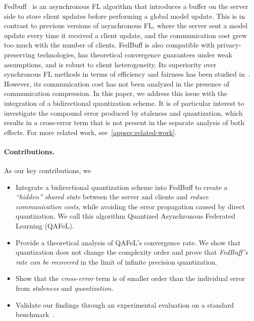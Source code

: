 \documentclass[nohyperref]{article}
\theoremstyle{plain}
\theoremstyle{definition}
\theoremstyle{remark}
\newcommand{\algname}{{QAFeL}\xspace} %
\begin{document}
Fedbuff~\cite{FedBuff} is an asynchronous FL algorithm that introduces a buffer on the server side to store client updates before performing a global model update.
This is in contrast to previous versions of asynchronous FL, where the server sent a model update every time it received a client update, and the communication cost grew too much with the number of clients.
FedBuff is also compatible with privacy-preserving technologies, has theoretical convergence guarantees under weak assumptions, and is robust to client heterogeneity.
Its superiority over synchronous FL methods in terms of efficiency and fairness has been studied in~\cite{papaya}.
However, its communication cost has not been analyzed in the presence of communication compression.
In this paper, we address this issue with the integration of a bidirectional quantization scheme.
It is of particular interest to investigate the compound error produced by staleness and quantization, which results in a cross-error term that is not present in the separate analysis of both effects.
For more related work, see~\cref{appsec:related-work}.
\vspace{-.1cm}
\paragraph{Contributions.} As our key contributions, we
\begin{itemize}[topsep=0pt, noitemsep]
    \setlength{\itemsep}{0pt}%
    \item Integrate a bidirectional quantization scheme into FedBuff to create a \emph{``hidden'' shared state} between the server and clients and \emph{reduce communication costs}, while avoiding the error propagation caused by direct quantization. We call this algorithm Quantized Asynchronous Federated Learning (\algname{}).
    \item Provide a theoretical analysis of \algname{}'s convergence rate. We show that quantization does not change the complexity order and prove that \emph{FedBuff's rate can be recovered} in the limit of infinite precision quantization.
    \item Show that the \emph{cross-error} term is of smaller order than the individual error from \emph{staleness} and \emph{quantization}.
    \item Validate our findings through an experimental evaluation on a standard benchmark~\cite{LEAF}.%
\end{itemize}
\end{document}
